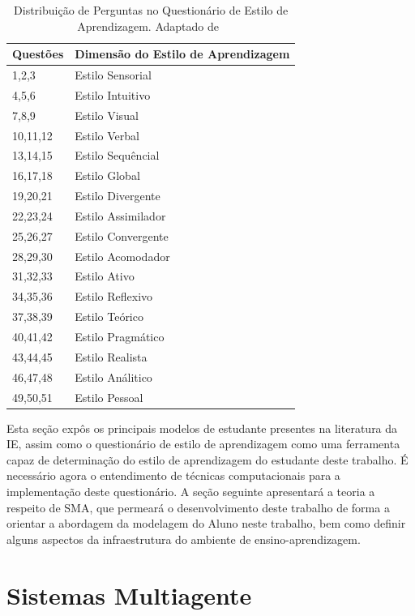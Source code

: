 \begin{table}
	\caption{Distribuição de Perguntas no Questionário de Estilo de Aprendizagem. Adaptado de~\cite{muhlbeier12}}
	\centering
	\begin{tabular}{|p{4cm} | p{8cm} |}
		\hline
		\textbf{Questões}	& \textbf{Dimensão do Estilo de Aprendizagem}	\\
		\hline
		1,2,3	&  Estilo Sensorial	\\
		\hline
		4,5,6	&  Estilo Intuitivo	\\
		\hline
		7,8,9	&  Estilo Visual	\\
		\hline
		10,11,12	&  Estilo Verbal	\\
		\hline
		13,14,15	&  Estilo Sequêncial	\\
		\hline
		16,17,18	&  Estilo Global	\\
		\hline
		19,20,21	&  Estilo Divergente	\\
		\hline
		22,23,24	&  Estilo Assimilador	\\
		\hline
		25,26,27	&  Estilo Convergente	\\
		\hline
		28,29,30	&  Estilo Acomodador	\\
		\hline
		31,32,33	&  Estilo Ativo	\\
		\hline
		34,35,36	&  Estilo Reflexivo	\\
		\hline
		37,38,39	&  Estilo Teórico	\\
		\hline
		40,41,42	&  Estilo Pragmático	\\
		\hline
		43,44,45	&  Estilo Realista	\\
		\hline
		46,47,48	&  Estilo Análitico	\\
		\hline
		49,50,51	&  Estilo Pessoal	\\
		\hline
	\end{tabular}
	\label{questionario_ie}
\end{table}

Esta seção expôs os principais modelos de estudante presentes na literatura da IE, assim como o questionário de estilo de aprendizagem como uma ferramenta capaz de determinação do estilo de aprendizagem do estudante deste trabalho. É necessário agora o entendimento de técnicas computacionais para a implementação deste questionário. A seção seguinte apresentará a teoria a respeito de SMA, que permeará o desenvolvimento deste trabalho de forma a orientar a abordagem da modelagem do Aluno neste trabalho, bem como definir alguns aspectos da infraestrutura do ambiente de ensino-aprendizagem.

\section{Sistemas Multiagente}

